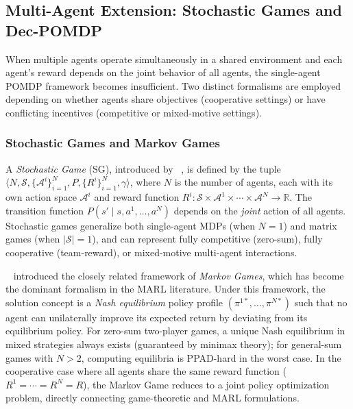 \documentclass[12pt, a4paper]{article}
\begin{document}
\subsection{Multi-Agent Extension: Stochastic Games and Dec-POMDP}
\label{sec:multiagent_formalism}

When multiple agents operate simultaneously in a shared environment and each
agent's reward depends on the joint behavior of all agents, the single-agent
POMDP framework becomes insufficient.  Two distinct formalisms are employed
depending on whether agents share objectives (cooperative settings) or have
conflicting incentives (competitive or mixed-motive settings).

\subsubsection*{Stochastic Games and Markov Games}

A \emph{Stochastic Game} (SG), introduced by
\citeauthor{shapley1953stochastic}~\cite{shapley1953stochastic}, is defined by
the tuple
$\langle N, \mathcal{S}, \{\mathcal{A}^i\}_{i=1}^N, P, \{R^i\}_{i=1}^N, \gamma \rangle$,
where $N$ is the number of agents, each with its own action space
$\mathcal{A}^i$ and reward function
$R^i: \mathcal{S} \times \mathcal{A}^1 \times \cdots \times
\mathcal{A}^N \to \mathbb{R}$.
The transition function $P(s' \mid s, a^1, \ldots, a^N)$ depends on the
\emph{joint} action of all agents.  Stochastic games generalize both
single-agent MDPs (when $N=1$) and matrix games (when $|\mathcal{S}|=1$),
and can represent fully competitive (zero-sum), fully cooperative (team-reward),
or mixed-motive multi-agent interactions.

\citeauthor{littman1994markov}~\cite{littman1994markov} introduced the closely
related framework of \emph{Markov Games}, which has become the dominant
formalism in the MARL literature.  Under this framework, the solution concept
is a \emph{Nash equilibrium} policy profile
$(\pi^{1*}, \ldots, \pi^{N*})$ such that no agent can unilaterally improve its
expected return by deviating from its equilibrium policy.  For zero-sum
two-player games, a unique Nash equilibrium in mixed strategies always exists
(guaranteed by minimax theory); for general-sum games with $N > 2$, computing
equilibria is PPAD-hard in the worst case.  In the cooperative case where all
agents share the same reward function ($R^1 = \cdots = R^N = R$), the Markov
Game reduces to a joint policy optimization problem, directly connecting
game-theoretic and MARL formulations.
\end{document}
